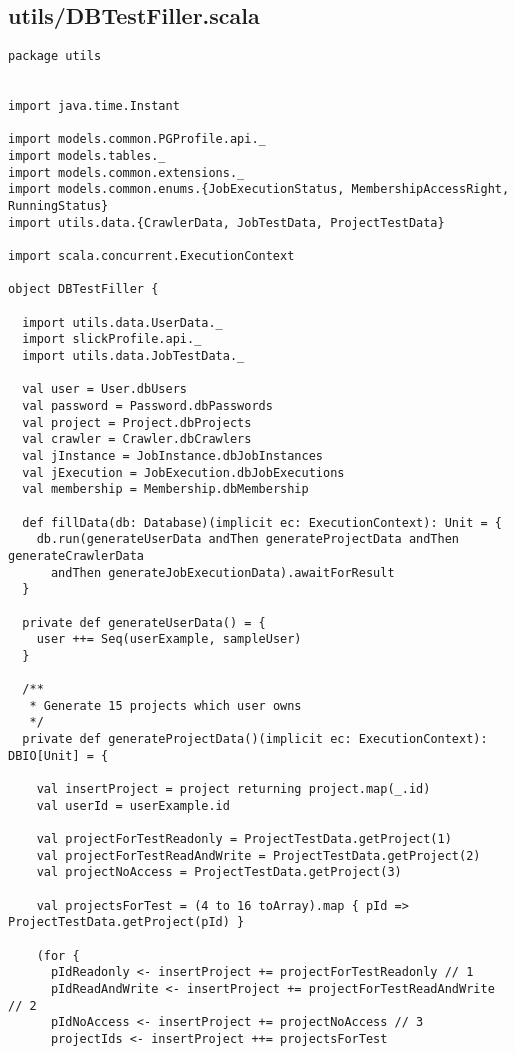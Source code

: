 \subsection{utils/DBTestFiller.scala}
\begin{lstlisting}
package utils


import java.time.Instant

import models.common.PGProfile.api._
import models.tables._
import models.common.extensions._
import models.common.enums.{JobExecutionStatus, MembershipAccessRight, RunningStatus}
import utils.data.{CrawlerData, JobTestData, ProjectTestData}

import scala.concurrent.ExecutionContext

object DBTestFiller {

  import utils.data.UserData._
  import slickProfile.api._
  import utils.data.JobTestData._

  val user = User.dbUsers
  val password = Password.dbPasswords
  val project = Project.dbProjects
  val crawler = Crawler.dbCrawlers
  val jInstance = JobInstance.dbJobInstances
  val jExecution = JobExecution.dbJobExecutions
  val membership = Membership.dbMembership

  def fillData(db: Database)(implicit ec: ExecutionContext): Unit = {
    db.run(generateUserData andThen generateProjectData andThen generateCrawlerData
      andThen generateJobExecutionData).awaitForResult
  }

  private def generateUserData() = {
    user ++= Seq(userExample, sampleUser)
  }

  /**
   * Generate 15 projects which user owns
   */
  private def generateProjectData()(implicit ec: ExecutionContext): DBIO[Unit] = {

    val insertProject = project returning project.map(_.id)
    val userId = userExample.id

    val projectForTestReadonly = ProjectTestData.getProject(1)
    val projectForTestReadAndWrite = ProjectTestData.getProject(2)
    val projectNoAccess = ProjectTestData.getProject(3)

    val projectsForTest = (4 to 16 toArray).map { pId => ProjectTestData.getProject(pId) }

    (for {
      pIdReadonly <- insertProject += projectForTestReadonly // 1
      pIdReadAndWrite <- insertProject += projectForTestReadAndWrite // 2
      pIdNoAccess <- insertProject += projectNoAccess // 3
      projectIds <- insertProject ++= projectsForTest


\end{lstlisting}
